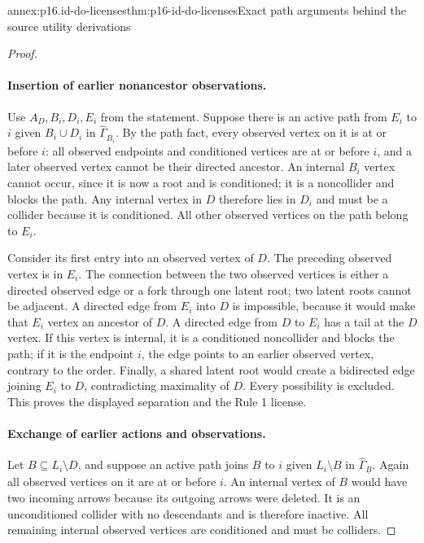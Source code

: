 \begin{annexitem}{annex:p16.id-do-licenses}{thm:p16-id-do-licenses}{Exact path arguments behind the source utility derivations}
\begin{proof}
\paragraph{Insertion of earlier nonancestor observations.}
Use \(A_D,B_i,D_i,E_i\) from the statement. Suppose there is
an active path from \(E_i\) to \(i\) given \(B_i\cup D_i\)
in \(\widehat\Gamma_{\overline{B_i}}\). By the path fact,
every observed vertex on it is at or before \(i\): all observed
endpoints and conditioned vertices are at or before \(i\), and
a later observed vertex cannot be their directed ancestor.
An internal \(B_i\) vertex cannot occur, since it is now a
root and is conditioned; it is a noncollider and blocks the path.
Any internal vertex in \(D\) therefore lies in \(D_i\) and
must be a collider because it is conditioned. All other observed
vertices on the path belong to \(E_i\).

Consider its first entry into an observed vertex of \(D\).
The preceding observed vertex is in \(E_i\). The connection
between the two observed vertices is either a directed observed
edge or a fork through one latent root; two latent roots cannot
be adjacent. A directed edge from \(E_i\) into \(D\) is
impossible, because it would make that \(E_i\) vertex an
ancestor of \(D\). A directed edge from \(D\) to \(E_i\)
has a tail at the \(D\) vertex. If this vertex is internal,
it is a conditioned noncollider and blocks the path; if it is
the endpoint \(i\), the edge points to an earlier observed
vertex, contrary to the order. Finally, a shared latent root
would create a bidirected edge joining \(E_i\) to \(D\),
contradicting maximality of \(D\). Every possibility is excluded.
This proves the displayed separation and the Rule 1 license.

\paragraph{Exchange of earlier actions and observations.}
Let \(B\subseteq L_i\setminus D\), and suppose an active
path joins \(B\) to \(i\) given \(L_i\setminus B\) in
\(\widehat\Gamma_{\underline B}\). Again all observed vertices
on it are at or before \(i\). An internal vertex of \(B\)
would have two incoming arrows because its outgoing arrows were
deleted. It is an unconditioned collider with no descendants and
is therefore inactive. All remaining internal observed vertices
are conditioned and must be colliders.


\end{proof}
\end{annexitem}
